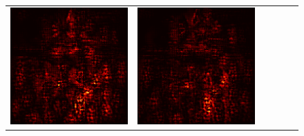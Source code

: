 \documentclass[preprint,12pt]{elsarticle}
\begin{document}
\begin{figure}[p]
\begin{tabular}{cccccc}
  \includegraphics[scale=\scale]{../visualizations/examples/imagenette/cnn/positive_saliency_map/8.png} & 
  \includegraphics[scale=\scale]{../visualizations/examples/imagenette/cnn/negative_saliency_map/8.png} & 

\end{tabular}
\end{figure}
\end{document}

